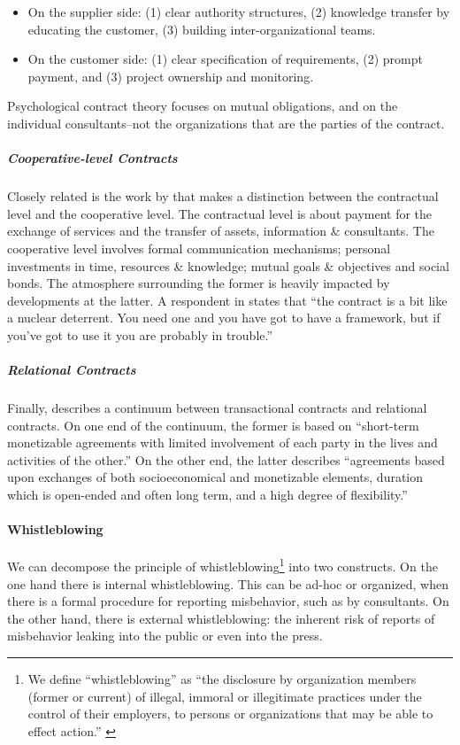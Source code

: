 \documentclass[12pt]{article}
\providecommand{\tightlist}{%
  \setlength{\itemsep}{0pt}\setlength{\parskip}{0pt}}
\begin{document}
\begin{itemize}
\tightlist
\item
  On the supplier side: (1) clear authority structures, (2) knowledge
  transfer by educating the customer, (3) building inter-organizational
  teams.
\item
  On the customer side: (1) clear specification of requirements, (2)
  prompt payment, and (3) project ownership and monitoring.
\end{itemize}

Psychological contract theory focuses on mutual obligations, and on the
individual consultants--not the organizations that are the parties of
the contract.

\subparagraph{Cooperative-level
Contracts}\label{cooperative-level-contracts}

Closely related is the work by \citet[9-13]{willcockskern} that makes a
distinction between the contractual level and the cooperative level. The
contractual level is about payment for the exchange of services and the
transfer of assets, information \& consultants. The cooperative level
involves formal communication mechanisms; personal investments in time,
resources \& knowledge; mutual goals \& objectives and social bonds. The
atmosphere surrounding the former is heavily impacted by developments at
the latter. A respondent in \citet[9]{willcockskern} states that ``the
contract is a bit like a nuclear deterrent. You need one and you have
got to have a framework, but if you've got to use it you are probably in
trouble.''

\subparagraph{Relational Contracts}\label{relational-contracts}

Finally, \citet[10-12]{rousseau1993} describes a continuum between
transactional contracts and relational contracts. On one end of the
continuum, the former is based on ``short-term monetizable agreements
with limited involvement of each party in the lives and activities of
the other.'' On the other end, the latter describes ``agreements based
upon exchanges of both socioeconomical and monetizable elements,
duration which is open-ended and often long term, and a high degree of
flexibility.''

\paragraph{Whistleblowing}\label{whistleblowing}

We can decompose the principle of whistleblowing\footnote{We define
  ``whistleblowing'' as ``the disclosure by organization members (former
  or current) of illegal, immoral or illegitimate practices under the
  control of their employers, to persons or organizations that may be
  able to effect action.'' \citep[ 4]{near1985}} into two constructs. On
the one hand there is internal whistleblowing. This can be ad-hoc or
organized, when there is a formal procedure for reporting misbehavior,
such as by consultants. On the other hand, there is external
whistleblowing: the inherent risk of reports of misbehavior leaking into
the public or even into the press.
\end{document}
